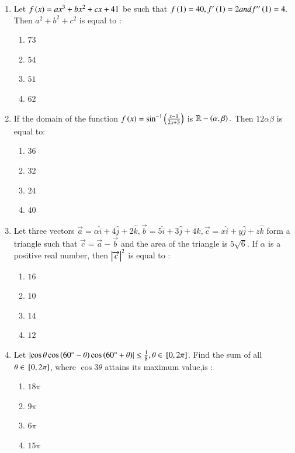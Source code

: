 \documentclass[journal,12pt,onecolumn]{IEEEtran}
\theoremstyle{remark}
\begin{document}
\begin{enumerate}
\begin{enumerate}
     \item $x^2-195x+9466=0$
     \item $x^2-190x+9466=0$
     \end{enumerate}
\item Let $f\left(x\right)=ax^3+bx^2+cx+41$ be such that $f\left(1\right)=40, f^{\prime}\left(1\right)=2 and f^{\prime\prime}\left(1\right)=4.$ Then $a^2+b^2+c^2$ is equal to :
     \begin{enumerate}
     \item $73$ \item $54$ \item $51$ \item $62$
     \end{enumerate}
\item If the domain of the function $f\left(x\right)=\sin ^{-1} \left(\frac{x-1}{2x+3}\right)$ is $\mathbb{R}-\left(\alpha,\beta\right).$ Then $12\alpha \beta$ is equal to:
     \begin{enumerate}
     \item $36$ \item $32$ \item $24$ \item $40$
     \end{enumerate}
\item Let three vectors $\overrightarrow{a}=\alpha \hat{i}+4\hat{j}+2\hat{k},\overrightarrow{b}=5\hat{i}+3\hat{j}+4\hat{k},\overrightarrow{c}=x\hat{i}+y\hat{j}+z\hat{k}$ form a triangle such that $\overrightarrow{c}=\overrightarrow{a}-\overrightarrow{b}$ and the area of the triangle is $5\sqrt{6}$. If $\alpha$ is a positive real number, then $\left\vert\overrightarrow{c}\right\vert^2$ is equal to :
     \begin{enumerate}
     \item $16$ \item $10$ \item $14$ \item $12$
     \end{enumerate}
\item Let $\left\vert\cos \theta \cos \left(60\degree -\theta\right) \cos \left(60\degree + \theta\right)\right\vert \leq \frac{1}{8}, \theta \in {}\left[0,2\pi\right]$. Find the sum of  all $\theta \in {}\left[0,2\pi\right]$, where $\cos 3 \theta $ attains its maximum value,is :
     \begin{enumerate}
     \item $18\pi$ \item $9\pi$ \item $6\pi$ \item $15\pi$
     \end{enumerate}

\end{enumerate}
\end{document}

